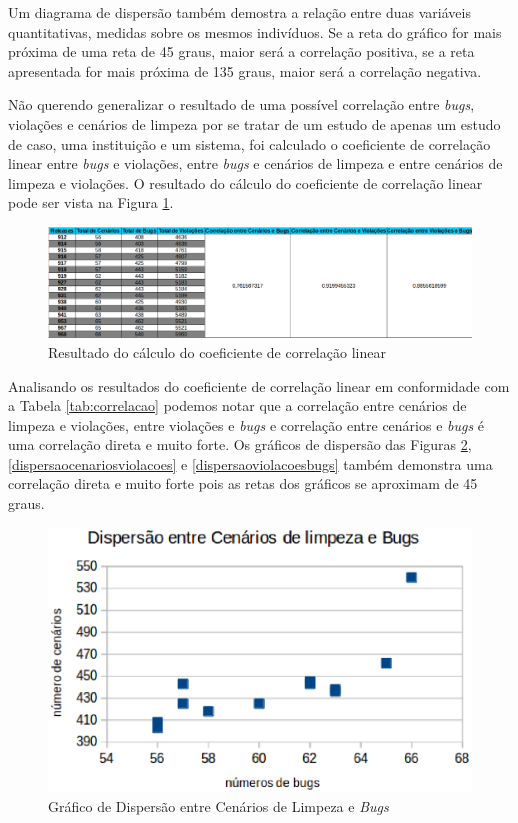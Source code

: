 Um diagrama de dispersão também demostra a relação entre duas variáveis quantitativas, medidas sobre os mesmos indivíduos. Se a reta do gráfico for mais próxima de
uma reta de 45 graus, maior será a correlação positiva, se a reta apresentada for mais próxima de 135 graus, maior será a correlação negativa. 

Não querendo generalizar o resultado de uma possível correlação entre \textit{bugs}, violações e cenários de limpeza por se tratar de um estudo de apenas um estudo de caso, uma instituição e um sistema, foi calculado o coeficiente de correlação linear entre \textit{bugs} e violações, entre \textit{bugs} e cenários de limpeza e entre cenários de limpeza e violações. O resultado do cálculo do coeficiente de correlação linear pode ser vista na Figura \ref{correlacao}.

\begin{figure}[h!]
\centering
\includegraphics[keepaspectratio=false,scale=0.40,angle=90]{figuras/figuras_nilton/correlacao.eps}
\caption{Resultado do cálculo do coeficiente de correlação linear}
\label{correlacao}
\end{figure}

Analisando os resultados do coeficiente de correlação linear em conformidade com a Tabela \ref{tab:correlacao} podemos notar que a correlação entre cenários de limpeza e violações, entre violações e \textit{bugs} e correlação entre cenários e \textit{bugs} é uma correlação direta e muito forte. Os gráficos de dispersão das Figuras \ref{dispercaocenariosbugs}, \ref{dispersaocenariosviolacoes} e \ref{dispersaoviolacoesbugs} também demonstra uma correlação direta e muito forte pois as retas dos gráficos se aproximam de 45 graus.

\begin{figure}[h!]
\centering
\includegraphics[keepaspectratio=false,scale=0.40]{figuras/figuras_nilton/dispercaocenariosbugs.eps}
\caption{Gráfico de Dispersão entre Cenários de Limpeza e \textit{Bugs}}
\label{dispercaocenariosbugs}
\end{figure}


